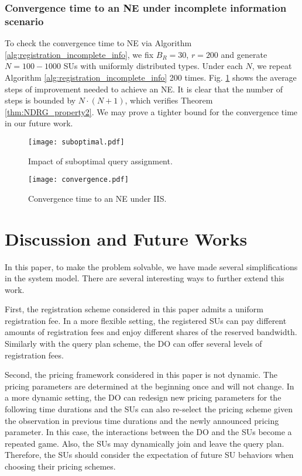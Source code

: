 \documentclass[journal]{IEEEtran}
\begin{document}
\subsubsection{Convergence time to an NE under incomplete information scenario}

To check the convergence time to NE via Algorithm \ref{alg:registration_incomplete_info}, we fix $B_R=30$, $r=200$ and generate $N=100-1000$ SUs with uniformly distributed types. Under each $N$, we repeat Algorithm \ref{alg:registration_incomplete_info} 200 times. Fig. \ref{fig:convergence} shows the average steps of improvement needed to achieve an NE. It is clear that the number of steps is bounded by $N\cdot(N+1)$, which verifies Theorem \ref{thm:NDRG_property2}. We may prove a tighter bound for the convergence time in our future work.

\begin{figure}[tp]
\centering
\begin{minipage}{1.6in}                                     \centering
\texttt{[image: suboptimal.pdf]}          \caption{Impact of suboptimal query assignment.}
\label{fig:suboptimal}
\end{minipage}
\begin{minipage}{1.6in}                                     \centering
\texttt{[image: convergence.pdf]}         \caption{Convergence time to an NE under IIS.}
\label{fig:convergence}
\end{minipage}
\vspace{-0.0cm}
\end{figure}

\section{Discussion and Future Works}

In this paper, to make the problem solvable, we have made several simplifications in the system model. There are several interesting ways to further extend this work.

First, the registration scheme considered in this paper admits a uniform registration fee. In a more flexible setting, the registered SUs can pay different amounts of registration fees and enjoy different shares of the reserved bandwidth. Similarly with the query plan scheme, the DO can offer several levels of registration fees.

Second, the pricing framework considered in this paper is not dynamic. The pricing parameters are determined at the beginning once and will not change. In a more dynamic setting, the DO can redesign new pricing parameters for the following time durations and the SUs can also re-select the pricing scheme given the observation in previous time durations and the newly announced pricing parameter. In this case, the interactions between the DO and the SUs become a repeated game. Also, the SUs may dynamically join and leave the query plan. Therefore, the SUs should consider the expectation of future SU behaviors when choosing their pricing schemes.
\end{document}
